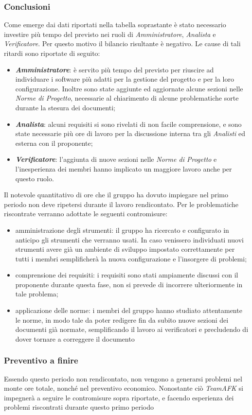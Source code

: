 \subsubsection{Conclusioni}
Come emerge dai dati riportati nella tabella soprastante è stato necessario investire più tempo del previsto nei ruoli di \textit{Amministratore}, \textit{Analista} e \textit{Verificatore}. Per questo motivo il bilancio risultante è negativo. Le cause di tali ritardi sono riportate di seguito:
\begin{itemize}
\item \textbf{\textit{Amministratore}}: è servito più tempo del previsto per riuscire ad individuare i software più adatti per la gestione del progetto e per la loro  configurazione. Inoltre sono state aggiunte ed aggiornate alcune sezioni nelle \textit{Norme di Progetto}, necessarie al chiarimento di alcune problematiche sorte durante la stesura dei documenti;
\item \textbf{\textit{Analista}}: alcuni requisiti si sono rivelati di non facile comprensione, e sono state necessarie più ore di lavoro per la discussione interna tra gli \textit{Analisti} ed esterna con il proponente;
\item \textbf{\textit{Verificatore}}: l’aggiunta di nuove sezioni nelle \textit{Norme di Progetto} e l'inesperienza dei membri hanno implicato un maggiore lavoro anche per questo ruolo.
\end{itemize}
Il notevole quantitativo di ore che il gruppo ha dovuto impiegare nel primo periodo non deve ripetersi durante il lavoro rendicontato. Per le problematiche riscontrate verranno adottate le seguenti contromisure:
\begin{itemize}
	\item amministrazione degli strumenti: il gruppo ha ricercato e configurato in anticipo gli strumenti che verranno usati. In caso venissero individuati nuovi strumenti avere già un ambiente di sviluppo impostato correttamente per tutti i membri semplificherà la nuova configurazione e l'insorgere di problemi;
	\item comprensione dei requisiti: i requisiti sono stati ampiamente discussi con il proponente durante questa fase, non si prevede di incorrere ulteriormente in tale problema;
	\item applicazione delle norme: i membri del gruppo hanno studiato attentamente le norme, in modo tale da poter redigere fin da subito nuove sezioni dei documenti già normate, semplificando il lavoro ai verificatori e precludendo di dover tornare a correggere il documento
\end{itemize}

\subsubsection{Preventivo a finire}
Essendo questo periodo non rendicontato, non vengono a generarsi problemi nel monte ore totale, nonché nel preventivo economico. Nonostante ciò \textit{TeamAFK} si impegnerà a seguire le contromisure sopra riportate, e facendo esperienza dei problemi riscontrati durante questo primo periodo